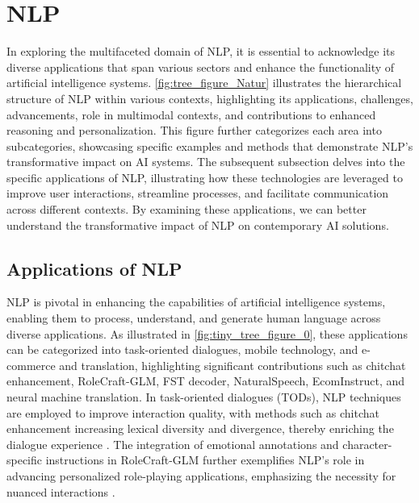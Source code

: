 \section{NLP} \label{sec:NLP}


In exploring the multifaceted domain of NLP, it is essential to acknowledge its diverse applications that span various sectors and enhance the functionality of artificial intelligence systems. \autoref{fig:tree_figure_Natur} illustrates the hierarchical structure of NLP within various contexts, highlighting its applications, challenges, advancements, role in multimodal contexts, and contributions to enhanced reasoning and personalization. This figure further categorizes each area into subcategories, showcasing specific examples and methods that demonstrate NLP's transformative impact on AI systems. The subsequent subsection delves into the specific applications of NLP, illustrating how these technologies are leveraged to improve user interactions, streamline processes, and facilitate communication across different contexts. By examining these applications, we can better understand the transformative impact of NLP on contemporary AI solutions.









\subsection{Applications of NLP} \label{subsec:Applications of NLP}

NLP is pivotal in enhancing the capabilities of artificial intelligence systems, enabling them to process, understand, and generate human language across diverse applications. As illustrated in \autoref{fig:tiny_tree_figure_0}, these applications can be categorized into task-oriented dialogues, mobile technology, and e-commerce and translation, highlighting significant contributions such as chitchat enhancement, RoleCraft-GLM, FST decoder, NaturalSpeech, EcomInstruct, and neural machine translation. In task-oriented dialogues (TODs), NLP techniques are employed to improve interaction quality, with methods such as chitchat enhancement increasing lexical diversity and divergence, thereby enriching the dialogue experience \cite{stricker2024enhancingtaskorienteddialogueschitchat}. The integration of emotional annotations and character-specific instructions in RoleCraft-GLM further exemplifies NLP's role in advancing personalized role-playing applications, emphasizing the necessity for nuanced interactions \cite{tao2024rolecraftglmadvancingpersonalizedroleplaying}.

